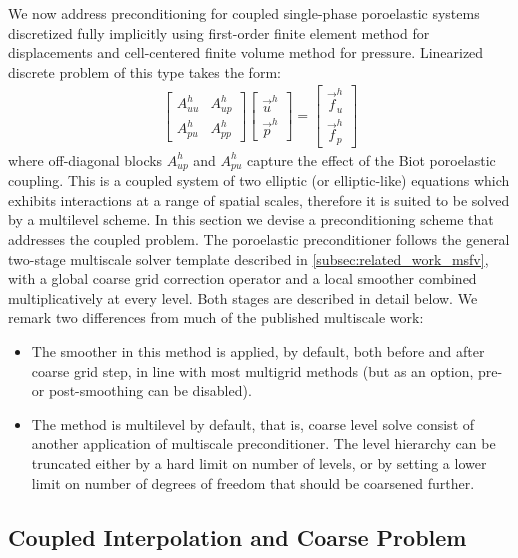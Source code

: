 We now address preconditioning for coupled single-phase poroelastic systems discretized fully implicitly using first-order finite element method for displacements and cell-centered finite volume method for pressure.   Linearized discrete problem of this type takes the form:
\begin{align}
    \begin{bmatrix}
        A_{uu}^h & A_{up}^h \\
        A_{pu}^h & A_{pp}^h
    \end{bmatrix}
    \begin{bmatrix}
        \vec{u}^h \\
        \vec{p}^h
    \end{bmatrix} =
    \begin{bmatrix}
        \vec{f}_u^h \\
        \vec{f}_p^h
    \end{bmatrix}
    \label{eq:coupled_poroelastic_linear_system}
\end{align}
where off-diagonal blocks $A_{up}^h$ and $A_{pu}^h$ capture the effect of the Biot poroelastic coupling.   This is a coupled system of two elliptic (or elliptic-like) equations which exhibits interactions at a range of spatial scales, therefore it is suited to be solved by a multilevel scheme.   In this section we devise a preconditioning scheme that addresses the coupled problem.   The poroelastic preconditioner follows the general two-stage multiscale solver template described in \cref{subsec:related_work_msfv}, with a global coarse grid correction operator and a local smoother combined multiplicatively at every level.   Both stages are described in detail below.    We remark two differences from much of the published multiscale work:
\begin{itemize}
    \item The smoother in this method is applied, by default, both before and after coarse grid step, in line with most multigrid methods (but as an option, pre- or post-smoothing can be disabled).
    \item The method is multilevel by default, that is, coarse level solve consist of another application of multiscale preconditioner.   The level hierarchy can be truncated either by a hard limit on number of levels, or by setting a lower limit on number of degrees of freedom that should be coarsened further.
\end{itemize}

\subsection{Coupled Interpolation and Coarse Problem}
\label{subsec:coupled_interpolation}

